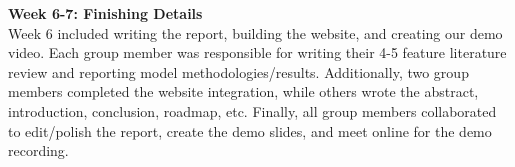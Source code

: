 \documentclass[conference]{IEEEtran}
\begin{document}
\vspace{1em}

\noindent\textbf{Week 6-7: Finishing Details}\\
Week 6 included writing the report, building the website, and creating our demo video. Each group member was responsible for writing their 4-5 feature literature review and reporting model methodologies/results. Additionally, two group members completed the website integration, while others wrote the abstract, introduction, conclusion, roadmap, etc. Finally, all group members collaborated to edit/polish the report, create the demo slides, and meet online for the demo recording.



\end{document}
